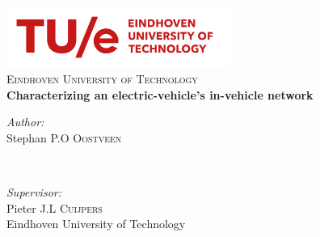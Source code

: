 \begin{titlepage}

\newcommand{\HRule}{\rule{\linewidth}{0.5mm}} %

\center %
 
\includegraphics[width=0.55\textwidth]{images/tuelogonew.png}\\[0.7cm]
\textsc{\LARGE Eindhoven University of Technology}\\[3cm] %


{ \huge \bfseries Characterizing an electric-vehicle's in-vehicle network}\\[3cm] %


\begin{minipage}[t]{0.5\textwidth}
\begin{flushleft} \large
\emph{Author:}\\
Stephan P.O \textsc{Oostveen}\\
\end{flushleft}
\end{minipage}
~
\begin{minipage}[t]{0.45\textwidth}
\begin{flushright} \large
\emph{Supervisor:} \\ 
Pieter J.L \textsc{Cuijpers}\\  %
Eindhoven University of Technology
\end{flushright}
\end{minipage}\\[4cm]


\end{titlepage}
